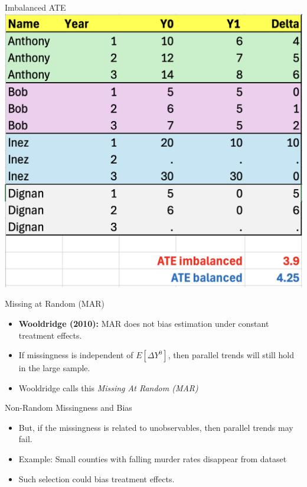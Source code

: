 \documentclass{beamer}
\begin{document}
\begin{frame}{Imbalanced ATE}
  \centering
  \includegraphics[height=0.85\textheight,keepaspectratio]{./lecture_includes/imbalanced.png}
\end{frame}

\begin{frame}{Missing at Random (MAR)}
  \begin{itemize}
    \item \textbf{Wooldridge (2010):} MAR does not bias estimation under constant treatment effects.
    \item If missingness is independent of $E[\Delta Y^0]$, then parallel trends will still hold in the large sample.
    \item Wooldridge calls this \emph{Missing At Random (MAR)}
  \end{itemize}
\end{frame}

\begin{frame}{Non-Random Missingness and Bias}
  \begin{itemize}
    \item But, if the missingness is related to unobservables, then parallel trends may fail.
    \item Example: Small counties with falling murder rates disappear from dataset 
    \item Such selection could bias treatment effects.
  \end{itemize}
\end{frame}
\end{document}
